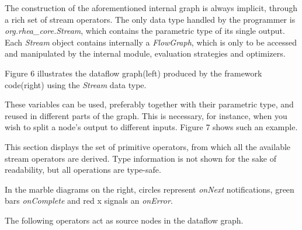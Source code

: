\documentclass{dithesis}
\begin{document}

The construction of the aforementioned internal graph is always implicit, through a rich set of stream operators. The only data type handled by the programmer is \textit{org.rhea\_core.Stream}, which contains the parametric type of its single output. Each \textit{Stream} object contains internally a \textit{FlowGraph}, which is only to be accessed and manipulated by the internal module, evaluation strategies and optimizers.

Figure 6 illustrates the dataflow graph(left) produced by the framework code(right) using the \textit{Stream} data type.


These variables can be used, preferably together with their parametric type, and reused in different parts of the graph. This is necessary, for instance, when you wish to split a node's output to different inputs. Figure 7 shows such an example.


This section displays the set of primitive operators, from which all the available stream operators are derived. Type information is not shown for the sake of readability, but all operations are type-safe.

In the marble diagrams on the right, circles represent \textit{onNext} notifications, green bars \textit{onComplete} and red x signals an \textit{onError}.

\newcommand{\lll}{0.4\linewidth}
\newcommand{\rrr}{0.4\linewidth}

The following operators act as source nodes in the dataflow graph.
\begin{description}
\end{description}
\end{document}
